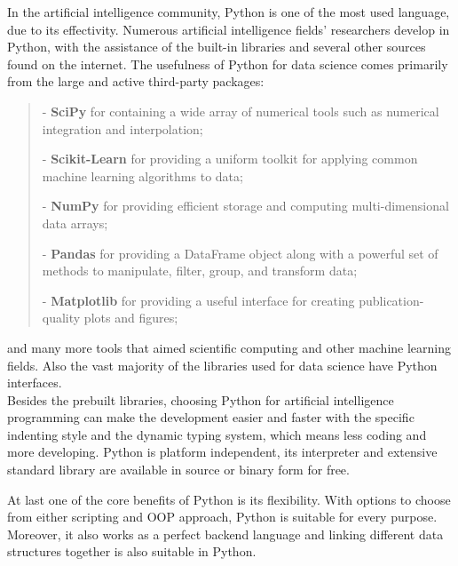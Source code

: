 In the artificial intelligence community, Python is one of the most used language, due to its effectivity. Numerous artificial intelligence fields' researchers develop in Python, with the assistance of the built-in libraries and several other sources found on the internet. The usefulness of Python for data science comes primarily from the large and active third-party packages:  
\begin{verse}
	- \textbf{SciPy} for containing a wide array of numerical tools such as numerical integration and interpolation;
	
	- \textbf{Scikit-Learn} for providing a uniform toolkit for applying common machine learning algorithms to data;
	
	- \textbf{NumPy} for providing efficient storage and computing multi-dimensional data arrays;
	
	-  \textbf{Pandas} for providing a DataFrame object along with a powerful set of methods to manipulate, filter, group, and transform data; 
	
	- \textbf{Matplotlib} for providing a useful interface for creating publication-quality plots and figures;
\end{verse} 
and many more tools that aimed scientific computing and other machine learning fields. Also the vast majority of the libraries used for data science have Python interfaces.\\ 
Besides the prebuilt libraries, choosing Python for artificial intelligence programming can make the development easier and faster with the specific indenting style and the dynamic typing system, which means less coding and more developing. Python is platform independent, its interpreter and extensive standard library are available in source or binary form for free.

At last one of the core benefits of Python is its flexibility. With options to choose from either scripting and OOP approach, Python is suitable for every purpose. Moreover, it also works as a perfect backend language and linking different data structures together is also suitable in Python.